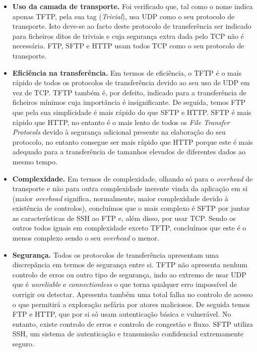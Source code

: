\begin{itemize}

  \item \textbf{Uso da camada de transporte.} Foi verificado que, tal como o nome indica apenas TFTP, pela sua tag (\emph{Trivial}), usa UDP como o seu protocolo de transporte. Isto deve-se ao facto deste protocolo de transferência ser indicado para ficheiros ditos de triviais e cuja segurança extra dada pelo TCP não é necessária. FTP, SFTP e HTTP usam todos TCP como o seu protocolo de transporte.

  \item \textbf{Eficiência na transferência.} Em termos de eficiência, o TFTP é o mais rápido de todos os protocolos de transferência devido ao seu uso de UDP em vez de TCP. TFTP também é, por defeito, indicado para a transferência de ficheiros mínimos cuja importância é insignificante. De seguida, temos FTP que pela sua simplicidade é mais rápido do que SFTP e HTTP. SFTP é mais rápido que HTTP, no entanto é o mais lento de todos os \emph{File Transfer Protocols} devido à segurança adicional presente na elaboração do seu protocolo, no entanto consegue ser mais rápido que HTTP porque este é mais adequado para a transferência de tamanhos elevados de diferentes dados ao mesmo tempo.

  \item \textbf{Complexidade.} Em termos de complexidade, olhando só para o \emph{overhead} de transporte e não para outra complexidade inerente vinda da aplicação em si (maior \emph{overhead} significa, normalmente, maior complexidade devido à existência de controlos), concluímos que o mais complexo é SFTP por juntar as características de SSH ao FTP e, além disso, por usar TCP. Sendo os outros todos iguais em complexidade exceto TFTP, concluímos que este é o menos complexo sendo o seu \emph{overhead} o menor.

  \item \textbf{Segurança.} Todos os protocolos de transferência apresentam uma discrepância em termos de segurança entre si. TFTP não apresenta nenhum controlo de erros ou outro tipo de segurança, indo ao extremo de usar UDP que é \emph{unreliable} e \emph{connectionless} o que torna qualquer erro impossível de corrigir ou detectar. Apresenta também uma total falha no controlo de acesso o que permitirá a exploração nefária por atores maliciosos. De seguida temos FTP e HTTP, que por si só usam autenticação básica e vulnerável. No entanto, existe controlo de erros e controlo de congestão e fluxo. SFTP utiliza SSH, um sistema de autenticação e transmissão confidencial extremamente seguro.

\end{itemize}

